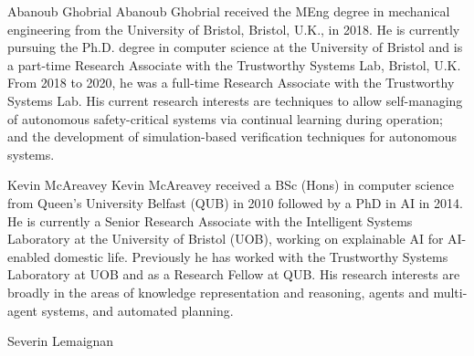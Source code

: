 \documentclass[letterpaper, 10 pt, journal, twoside]{IEEEtran}
\begin{document}
\begin{IEEEbiography}{Abanoub Ghobrial}
Abanoub Ghobrial received the MEng degree in mechanical engineering from the University of Bristol, Bristol,  U.K., in 2018. He is currently pursuing the Ph.D. degree in computer science at the University of Bristol and is a part-time Research Associate with the Trustworthy Systems Lab, Bristol,  U.K. From 2018 to 2020, he was a full-time Research Associate with the Trustworthy Systems Lab. His current research interests are techniques to allow self-managing of autonomous safety-critical systems via continual learning during operation; and the development of simulation-based verification techniques for autonomous systems.
\end{IEEEbiography}

\begin{IEEEbiography}{Kevin McAreavey}
Kevin McAreavey received a BSc (Hons) in computer science from Queen's University Belfast (QUB) in 2010 followed by a PhD in AI in 2014. He is currently a Senior Research Associate with the Intelligent Systems Laboratory at the University of Bristol (UOB), working on explainable AI for AI-enabled domestic life. Previously he has worked with the Trustworthy Systems Laboratory at UOB and as a Research Fellow at QUB. His research interests are broadly in the areas of knowledge representation and reasoning, agents and multi-agent systems, and automated planning.
\end{IEEEbiography}

\begin{IEEEbiography}{Severin Lemaignan}
\end{IEEEbiography}
\end{document}
